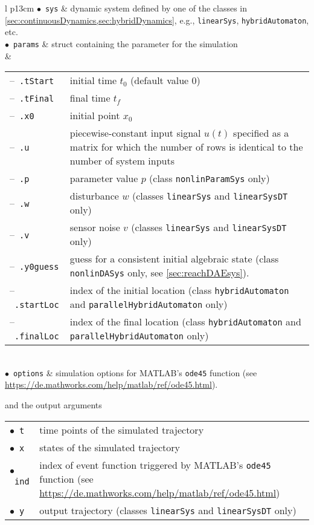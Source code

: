 \begin{center}
\renewcommand{\arraystretch}{1.3}
\begin{tabular}[t]{l p{13cm} }
	$\bullet$~\texttt{sys} &  dynamic system defined by one of the classes in \cref{sec:continuousDynamics,sec:hybridDynamics}, e.g., \texttt{linearSys}, \texttt{hybridAutomaton}, etc. \\
	$\bullet$~\texttt{params} & struct containing the parameter for the simulation \\
	 & \begin{tabular}[t]{l p{10cm}}	
	 	--~\texttt{.tStart} & initial time $t_0$ (default value 0) \\
	 	--~\texttt{.tFinal} & final time $t_f$ \\ 	
	 	--~\texttt{.x0} & initial point $x_0$ \\
	 	--~\texttt{.u} & piecewise-constant input signal $u(t)$ specified as a matrix for which the number of rows is identical to the number of system inputs \\
	 	--~\texttt{.p} & parameter value $p$ (class \texttt{nonlinParamSys} only) \\
	 	--~\texttt{.w} & disturbance $w$ (classes \texttt{linearSys} and \texttt{linearSysDT} only) \\
	 	--~\texttt{.v} & sensor noise $v$ (classes \texttt{linearSys} and \texttt{linearSysDT} only) \\
	 	--~\texttt{.y0guess} & guess for a consistent initial algebraic state (class \texttt{nonlinDASys} only, see \cref{sec:reachDAEsys}). \\
	 	--~\texttt{.startLoc} & index of the initial location (class \texttt{hybridAutomaton} and \texttt{parallelHybridAutomaton} only) \\
	 	--~\texttt{.finalLoc} & index of the final location (class \texttt{hybridAutomaton} and \texttt{parallelHybridAutomaton} only)
	 	\end{tabular}	\\
	$\bullet$~\texttt{options} & simulation options for MATLAB's \texttt{ode45} function (see \url{https://de.mathworks.com/help/matlab/ref/ode45.html}).
\end{tabular}
\end{center}
and the output arguments
\begin{center}
\renewcommand{\arraystretch}{1.3}
\begin{tabular}[t]{l p{13cm} }
	$\bullet$~\texttt{t} & time points of the simulated trajectory \\
	$\bullet$~\texttt{x} & states of the simulated trajectory \\
	$\bullet$~\texttt{ind} & index of event function triggered by MATLAB's \texttt{ode45} function (see \url{https://de.mathworks.com/help/matlab/ref/ode45.html}) \\
	$\bullet$~\texttt{y} & output trajectory (classes \texttt{linearSys} and \texttt{linearSysDT} only)
\end{tabular}
\end{center}

